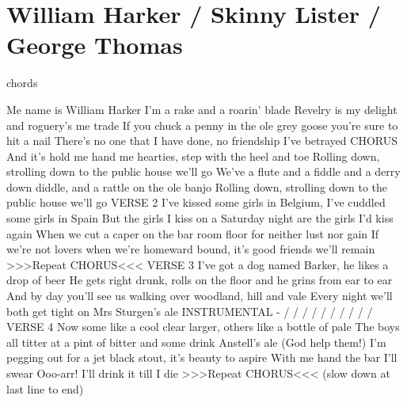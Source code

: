 \section{William Harker / Skinny Lister / George Thomas}\label{sec:william_harker}
  {\small chords}
  
  \Cmajor
  \Aminor
  \Dmajor
  
  Me  name is William Harker I'm a rake and a roarin' blade
   Revelry is  my delight and  roguery's me  trade
  If you  chuck a penny in the ole grey goose you're sure to hit a nail
   There's no one that  I have done, no  friendship  I've betrayed
  CHORUS
  And it's  hold me hand me hearties, step with the heel and toe
   Rolling down,  strolling down to the  public house we'll  go
  We've a  flute and a fiddle and a derry down diddle, and a rattle on the ole
  banjo
   Rolling down,  strolling down to the  public  house we'll  go
  VERSE 2
  I've  kissed some girls in Belgium, I've cuddled some girls in Spain
  But the  girls I kiss on a  Saturday night are the  girls I'd kiss 
  again
  When we  cut a caper on the bar room floor for neither lust nor gain
  If  we're not lovers when we're  homeward bound, it’s  good friends
   we'll  remain
  >>>Repeat CHORUS<<<
  VERSE 3
  I've  got a dog named Barker, he likes a drop of beer
  He  gets right drunk, rolls  on the floor and he  grins from ear to 
  ear
  And by  day you'll see us walking over woodland, hill and vale
   Every night we'll  both get tight on  Mrs  Sturgen's  ale
  INSTRUMENTAL -  /  /  /  /  /  /  /  /  /  / 
  VERSE 4
  Now  some like a cool clear larger, others like a bottle of pale
  The  boys all titter at a  pint of bitter and some  drink Anstell's 
  ale (God help them!)
  I'm  pegging out for a jet black stout, it's beauty to aspire
  With me  hand the bar I'll  swear Ooo-arr! I'll  drink it  till I  die
  >>>Repeat CHORUS<<< (slow down at last line to end)
